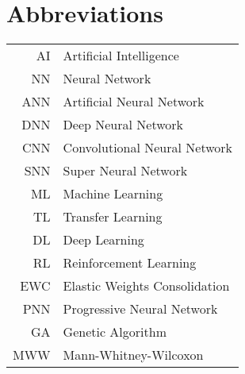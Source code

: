 \chapter*{Abbreviations}
\begin{table}[h]
    \centering
    \begin{tabular}{r|l}
    
AI     & Artificial Intelligence\\
NN     & Neural Network\\
ANN    & Artificial Neural Network\\
DNN    & Deep Neural Network\\
CNN    & Convolutional Neural Network\\
SNN    & Super Neural Network\\
ML     & Machine Learning\\
TL     & Transfer Learning\\
DL     & Deep Learning\\
RL     & Reinforcement Learning\\
EWC    & Elastic Weights Consolidation\\
PNN    & Progressive Neural Network\\
GA     & Genetic Algorithm\\
MWW    & Mann-Whitney-Wilcoxon
    \end{tabular}
\end{table}


